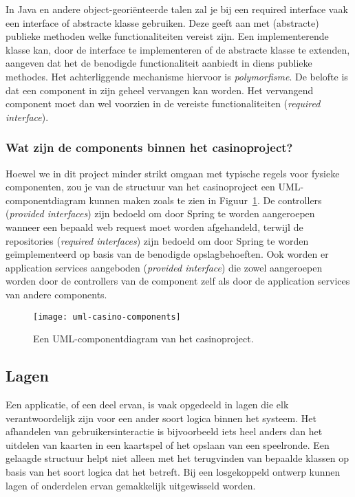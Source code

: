 \newpage
In Java en andere object-georiënteerde talen 
zal je bij een required interface vaak een interface of abstracte klasse gebruiken.
Deze geeft aan met (abstracte) publieke methoden welke functionaliteiten vereist zijn.
Een implementerende klasse kan, door de interface te implementeren of de abstracte klasse te extenden,
aangeven dat het de benodigde functionaliteit aanbiedt in diens publieke methodes.
Het achterliggende mechanisme hiervoor is \emph{polymorfisme}.
De belofte is dat een component in zijn geheel vervangen kan worden. 
Het vervangend component moet dan wel voorzien in de vereiste functionaliteiten 
(\emph{required interface}).

\subsubsection{Wat zijn de components binnen het casinoproject?}
Hoewel we in dit project minder strikt omgaan met typische regels
voor fysieke componenten,
zou je van de structuur van het casinoproject een UML-componentdiagram kunnen maken 
zoals te zien in Figuur~\ref{fig:uml-casino-components}.
De controllers (\emph{provided interfaces}) zijn bedoeld om door Spring te 
worden aangeroepen wanneer een bepaald web request moet worden afgehandeld,
terwijl de repositories (\emph{required interfaces}) zijn bedoeld om door Spring 
te worden geïmplementeerd op basis van de benodigde opslagbehoeften.
Ook worden er application services aangeboden (\emph{provided interface})
die zowel aangeroepen worden door de controllers van de component zelf als door 
de application services van andere components.

\begin{figure}[H]
    \centering
    \texttt{[image: uml-casino-components]}
    \caption{Een UML-componentdiagram van het casinoproject.}
    \label{fig:uml-casino-components}
\end{figure}

\newpage
\subsection{Lagen}
Een applicatie, of een deel ervan, is vaak opgedeeld in lagen die 
elk verantwoordelijk zijn voor een ander soort logica binnen het systeem.
Het afhandelen van gebruikersinteractie 
is bijvoorbeeld iets heel anders dan het uitdelen van kaarten in een
kaartspel of het opslaan van een speelronde.
Een gelaagde structuur helpt niet alleen met het terugvinden van
bepaalde klassen op basis van het soort logica dat het betreft. Bij een 
losgekoppeld ontwerp kunnen lagen of onderdelen ervan gemakkelijk uitgewisseld worden.

